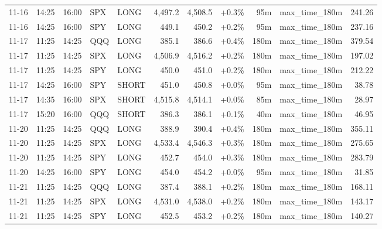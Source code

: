 \documentclass[11pt,a4paper,twoside]{article}
\begin{document}
\begin{center}
\begin{longtable}{>{\color{txtmain}}l l l l l r r r r >{\color{txtmain}}l r}
11-16 & 14:25 & 16:00 & SPX & LONG & 4,497.2 & 4,508.5 & \textcolor{wingreen}{+0.3\%} & 95m & max\_time\_180m & \textcolor{wingreen}{241.26} \\
11-16 & 14:25 & 16:00 & SPY & LONG & 449.1 & 450.2 & \textcolor{wingreen}{+0.2\%} & 95m & max\_time\_180m & \textcolor{wingreen}{237.16} \\
11-17 & 11:25 & 14:25 & QQQ & LONG & 385.1 & 386.6 & \textcolor{wingreen}{+0.4\%} & 180m & max\_time\_180m & \textcolor{wingreen}{379.54} \\
11-17 & 11:25 & 14:25 & SPX & LONG & 4,506.9 & 4,516.2 & \textcolor{wingreen}{+0.2\%} & 180m & max\_time\_180m & \textcolor{wingreen}{197.02} \\
11-17 & 11:25 & 14:25 & SPY & LONG & 450.0 & 451.0 & \textcolor{wingreen}{+0.2\%} & 180m & max\_time\_180m & \textcolor{wingreen}{212.22} \\
11-17 & 14:25 & 16:00 & SPY & SHORT & 451.0 & 450.8 & \textcolor{wingreen}{+0.0\%} & 95m & max\_time\_180m & \textcolor{wingreen}{38.78} \\
11-17 & 14:35 & 16:00 & SPX & SHORT & 4,515.8 & 4,514.1 & \textcolor{wingreen}{+0.0\%} & 85m & max\_time\_180m & \textcolor{wingreen}{28.97} \\
11-17 & 15:20 & 16:00 & QQQ & SHORT & 386.3 & 386.1 & \textcolor{wingreen}{+0.1\%} & 40m & max\_time\_180m & \textcolor{wingreen}{46.95} \\
11-20 & 11:25 & 14:25 & QQQ & LONG & 388.9 & 390.4 & \textcolor{wingreen}{+0.4\%} & 180m & max\_time\_180m & \textcolor{wingreen}{355.11} \\
11-20 & 11:25 & 14:25 & SPX & LONG & 4,533.4 & 4,546.3 & \textcolor{wingreen}{+0.3\%} & 180m & max\_time\_180m & \textcolor{wingreen}{275.65} \\
11-20 & 11:25 & 14:25 & SPY & LONG & 452.7 & 454.0 & \textcolor{wingreen}{+0.3\%} & 180m & max\_time\_180m & \textcolor{wingreen}{283.79} \\
11-20 & 14:25 & 16:00 & SPY & LONG & 454.0 & 454.2 & \textcolor{wingreen}{+0.0\%} & 95m & max\_time\_180m & \textcolor{wingreen}{31.85} \\
11-21 & 11:25 & 14:25 & QQQ & LONG & 387.4 & 388.1 & \textcolor{wingreen}{+0.2\%} & 180m & max\_time\_180m & \textcolor{wingreen}{168.11} \\
11-21 & 11:25 & 14:25 & SPX & LONG & 4,531.0 & 4,538.0 & \textcolor{wingreen}{+0.2\%} & 180m & max\_time\_180m & \textcolor{wingreen}{143.17} \\
11-21 & 11:25 & 14:25 & SPY & LONG & 452.5 & 453.2 & \textcolor{wingreen}{+0.2\%} & 180m & max\_time\_180m & \textcolor{wingreen}{140.27} \\

\end{longtable}
\end{center}
\end{document}
